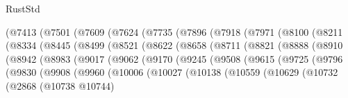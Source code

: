 \begin{lexlean}{RustStd}
\begin{coremodule}
{\begin{coremodule}
{{{{{{{{{{{{{{{{{{{{{{{{{{{{{{{{{{{{{{{{{{{{{{{{{{{{{{{{{{{{{{{{{{{{{{{{{{{{{{{{{{{{{              (@7413
                (@7501
                  (@7609
                    (@7624
                      (@7735
                        (@7896
                          (@7918
                            (@7971
                              (@8100
                                (@8211
                                  (@8334
                                    (@8445
                                      (@8499
                                        (@8521
                                          (@8622
                                            (@8658
                                              (@8711
                                                (@8821
                                                  (@8888
                                                    (@8910
                                                      (@8942
                                                        (@8983
                                                          (@9017
                                                            (@9062
                                                              (@9170
                                                                (@9245
                                                                  (@9508
                                                                    (@9615
                                                                      (@9725
                                                                        (@9796
                                                                          (@9830
                                                                            (@9908
                                                                              (@9960
                                                                                (@10006
                                                                                  (@10027
                                                                                    (@10138
                                                                                      (@10559
                                                                                        (@10629
                                                                                          (@10732
                                                                                            (@2868
                                                                                              (@10738
                                                                                                @10744)
}}}}}}}}}}}}}}}}}}}}}}}}}}}}}}}}}}}}}}}}}}}}}}}}}}}}}}}}}}}}}}}}}}}}}}}}}}}}}}}}}}}}}
\end{coremodule}}
\end{coremodule}
\end{lexlean}
